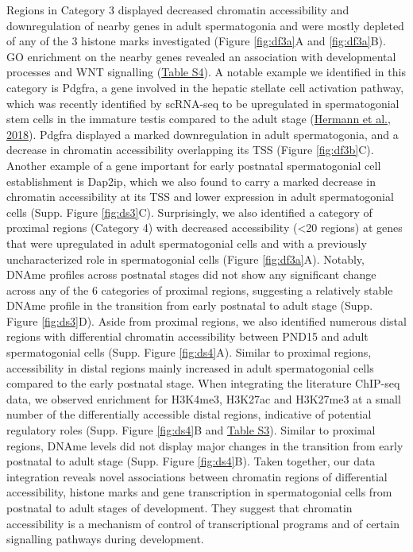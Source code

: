 \documentclass[12pt,twoside]{reedthesis}
\begin{document}
Regions in Category 3 displayed decreased chromatin accessibility and
downregulation of nearby genes in adult spermatogonia and were mostly
depleted of any of the 3 histone marks investigated (Figure \ref{fig:df3a}A and \ref{fig:df3a}B). GO
enrichment on the nearby genes revealed an association with
developmental processes and WNT signalling (\protect\hyperlink{st}{Table S4}). A notable example
we identified in this category is Pdgfra, a gene involved in the hepatic
stellate cell activation pathway, which was recently identified by
scRNA-seq to be upregulated in spermatogonial stem cells in the immature
testis compared to the adult stage (\protect\hyperlink{ref-hermann2018}{Hermann et al., 2018}). Pdgfra displayed a
marked downregulation in adult spermatogonia, and a decrease in
chromatin accessibility overlapping its TSS (Figure \ref{fig:df3b}C). Another example
of a gene important for early postnatal spermatogonial cell
establishment is Dap2ip, which we also found to carry a marked decrease
in chromatin accessibility at its TSS and lower expression in adult
spermatogonial cells (Supp. Figure \ref{fig:ds3}C). Surprisingly, we also identified a
category of proximal regions (Category 4) with decreased accessibility
(\textless20 regions) at genes that were upregulated in adult spermatogonial
cells and with a previously uncharacterized role in spermatogonial cells
(Figure \ref{fig:df3a}A). Notably, DNAme profiles across postnatal stages did not show
any significant change across any of the 6 categories of proximal
regions, suggesting a relatively stable DNAme profile in the transition
from early postnatal to adult stage (Supp. Figure \ref{fig:ds3}D). Aside from proximal
regions, we also identified numerous distal regions with differential
chromatin accessibility between PND15 and adult spermatogonial cells
(Supp. Figure \ref{fig:ds4}A). Similar to proximal regions, accessibility in distal regions
mainly increased in adult spermatogonial cells compared to the early
postnatal stage. When integrating the literature ChIP-seq data, we
observed enrichment for H3K4me3, H3K27ac and H3K27me3 at a small number
of the differentially accessible distal regions, indicative of potential
regulatory roles (Supp. Figure \ref{fig:ds4}B and \protect\hyperlink{st}{Table S3}). Similar to proximal regions,
DNAme levels did not display major changes in the transition from early
postnatal to adult stage (Supp. Figure \ref{fig:ds4}B). Taken together, our data
integration reveals novel associations between chromatin regions of
differential accessibility, histone marks and gene transcription in
spermatogonial cells from postnatal to adult stages of development. They
suggest that chromatin accessibility is a mechanism of control of
transcriptional programs and of certain signalling pathways during
development.
\end{document}
